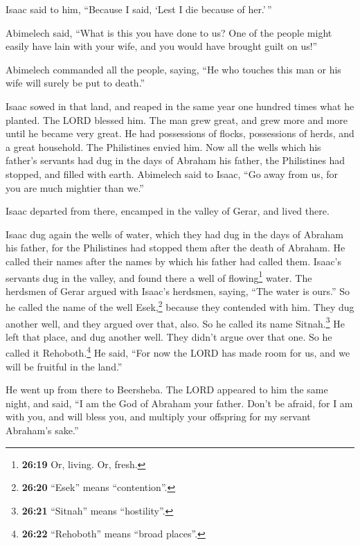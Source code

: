 Isaac said to him, ``Because I said, `Lest I die because of her.'\,''

 Abimelech said, ``What is this you have done to us? One
of the people might easily have lain with your wife, and you would have
brought guilt on us!''

 Abimelech commanded all the people, saying, ``He who
touches this man or his wife will surely be put to death.''

 Isaac sowed in that land, and reaped in the same year
one hundred times what he planted. The LORD blessed him. 
The man grew great, and grew more and more until he became very great.
 He had possessions of flocks, possessions of herds, and
a great household. The Philistines envied him.  Now all
the wells which his father's servants had dug in the days of Abraham his
father, the Philistines had stopped, and filled with earth.
 Abimelech said to Isaac, ``Go away from us, for you are
much mightier than we.''

 Isaac departed from there, encamped in the valley of
Gerar, and lived there.

 Isaac dug again the wells of water, which they had dug
in the days of Abraham his father, for the Philistines had stopped them
after the death of Abraham. He called their names after the names by
which his father had called them.  Isaac's servants dug
in the valley, and found there a well of flowing\footnote{\textbf{26:19}
  Or, living. Or, fresh.} water.  The herdsmen of Gerar
argued with Isaac's herdsmen, saying, ``The water is ours.'' So he
called the name of the well Esek,\footnote{\textbf{26:20} ``Esek'' means
  ``contention''.} because they contended with him.  They
dug another well, and they argued over that, also. So he called its name
Sitnah.\footnote{\textbf{26:21} ``Sitnah'' means ``hostility''.}
 He left that place, and dug another well. They didn't
argue over that one. So he called it Rehoboth.\footnote{\textbf{26:22}
  ``Rehoboth'' means ``broad places''.} He said, ``For now the LORD has
made room for us, and we will be fruitful in the land.''

 He went up from there to Beersheba.  The
LORD appeared to him the same night, and said, ``I am the God of Abraham
your father. Don't be afraid, for I am with you, and will bless you, and
multiply your offspring for my servant Abraham's sake.''

